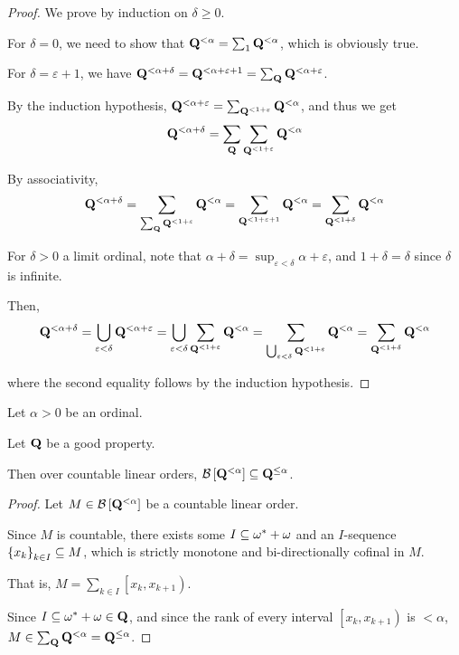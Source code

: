 \begin{proof}
  We prove by induction on $\delta \ge 0$.

  For $\delta = 0$, we need to show that $\mathbf{Q}^{< \alpha} = \sum_{1}\mathbf{Q}^{< \alpha}$,
  which is obviously true.

  For $\delta = \varepsilon + 1$, we have
  $
    \mathbf{Q}^{< \alpha + \delta}
    = \mathbf{Q}^{< \alpha + \varepsilon + 1}
    = \sum_{\mathbf{Q}}{\mathbf{Q}^{< \alpha + \varepsilon}}
  $.

  By the induction hypothesis,
  $
    \mathbf{Q}^{< \alpha + \varepsilon}
    = \sum_{\mathbf{Q}^{< 1 + \varepsilon}}{\mathbf{Q}^{< \alpha}}
  $, and thus we get
  \[
    \mathbf{Q}^{< \alpha + \delta} = \sum_{\mathbf{Q}}{\sum_{\mathbf{Q}^{< 1 + \varepsilon}}{\mathbf{Q}^{< \alpha}}}
  \]

  By associativity,
  \[\mathbf{Q}^{< \alpha + \delta}
    = \sum_{\sum_{\mathbf{Q}}{\mathbf{Q}^{< 1 + \varepsilon}}}{\mathbf{Q}^{< \alpha}}
    = \sum_{\mathbf{Q}^{< 1 + \varepsilon + 1}}{\mathbf{Q}^{< \alpha}}
    = \sum_{\mathbf{Q}^{< 1 + \delta}}{\mathbf{Q}^{< \alpha}}\]

  For $\delta > 0$ a limit ordinal, note that $\alpha + \delta = \sup_{\varepsilon < \delta}{\alpha + \varepsilon}$,
  and $1 + \delta = \delta$ since $\delta$ is infinite.

  Then,
  \[
    \mathbf{Q}^{< \alpha + \delta}
    = \bigcup_{\varepsilon < \delta}{\mathbf{Q}^{< \alpha + \varepsilon}}
    = \bigcup_{\varepsilon < \delta}{\sum_{\mathbf{Q}^{< 1 + \varepsilon}}{\mathbf{Q}^{< \alpha}}}
    = \sum_{\bigcup_{\varepsilon < \delta}{\mathbf{Q}^{< 1 + \varepsilon}}}{\mathbf{Q}^{< \alpha}}
    = \sum_{\mathbf{Q}^{< 1 + \delta}}{\mathbf{Q}^{< \alpha}}
  \]

  where the second equality follows by the induction hypothesis.

\end{proof}



\begin{lemma}
  Let $\alpha > 0$ be an ordinal.

  Let $\mathbf{Q}$ be a good property.

  Then over countable linear orders, $\mathcal{B} \left[ {{\mathbf{Q}^{< \alpha}}} \right] \subseteq \mathbf{Q}^{\le \alpha}$.
\end{lemma}

\begin{proof}
  Let $M \in \mathcal{B} \left[ {{\mathbf{Q}^{< \alpha}}} \right]$ be a countable linear order.

  Since $M$ is countable, there exists some $I \subseteq \omega^\ast + \omega$ and
  an $I$-sequence $\left\{ {x_k} \right\}_{k \in I} \subseteq M$,
  which is strictly monotone and bi-directionally cofinal in $M$.

  That is, $M = \sum_{k \in I} \left[ x_k, x_{k + 1} \right)$.

  Since $I \subseteq \omega^\ast + \omega \in \mathbf{Q}$, and
  since the rank of every interval $\left[ x_k, x_{k + 1} \right)$ is $< \alpha$,
  $M \in \sum_{\mathbf{Q}}{\mathbf{Q}^{< \alpha}} = \mathbf{Q}^{\le \alpha}$.

\end{proof}